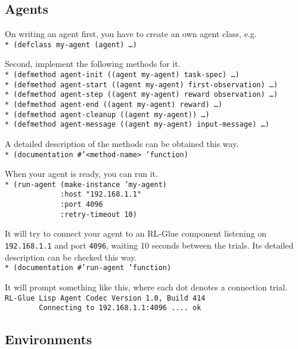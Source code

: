\documentclass[11pt,a4paper,dvipdfm]{article}
\newcommand{\prompttext}[1]{\texttt{#1}}
\newcommand{\lispprompt}[1]{\prompttext{* #1}}
\begin{document}
\subsection{Agents}

On writing an agent first, you have to create an own agent class, e.g. \\
\lispprompt{(defclass my-agent (agent) \ldots)}

Second, implement the following methods for it. \\
\lispprompt{(defmethod agent-init ((agent my-agent) task-spec) \ldots)} \\
\lispprompt{(defmethod agent-start ((agent my-agent) first-observation) \ldots)} \\
\lispprompt{(defmethod agent-step ((agent my-agent) reward observation) \ldots)} \\
\lispprompt{(defmethod agent-end ((agent my-agent) reward) \ldots)} \\
\lispprompt{(defmethod agent-cleanup ((agent my-agent)) \ldots)} \\
\lispprompt{(defmethod agent-message ((agent my-agent) input-message) \ldots)}

A detailed description of the methods can be obtained this way. \\
\lispprompt{(documentation \#'<method-name> 'function)}

When your agent is ready, you can run it. \\
\lispprompt{(run-agent (make-instance 'my-agent) \\
\mbox{~~~~~~~~~~~~~}:host "192.168.1.1" \\
\mbox{~~~~~~~~~~~~~}:port 4096 \\
\mbox{~~~~~~~~~~~~~}:retry-timeout 10)}

It will try to connect your agent to an RL-Glue component listening on
\prompttext{192.168.1.1} and port \prompttext{4096}, waiting 10 seconds
between the trials. Its detailed description can be checked this way. \\
\lispprompt{(documentation \#'run-agent 'function)}

It will prompt something like this, where each dot denotes a connection
trial. \\
\prompttext{RL-Glue Lisp Agent Codec Version 1.0, Build 414} \\
\prompttext{\mbox{~~~~~~~~}Connecting to 192.168.1.1:4096 ....~ok}

\subsection{Environments}
\end{document}

